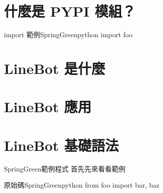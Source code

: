 \documentclass{article}
\begin{document}

\begin{large}

\section{什麼是 PYPI 模組？}
    \begin{mintbox}{import 範例}{SpringGreen}{python}
        import foo
    \end{mintbox}
\section{LineBot 是什麼}
\section{LineBot 應用}
\section{LineBot 基礎語法}
\begin{boxpar}{SpringGreen}{範例程式}
首先先來看看範例
    \begin{mintbox}{原始碼}{SpringGreen}{python}
	from foo import bar, baz
    \end{mintbox}
\end{boxpar}

\end{large}
\end{document}
